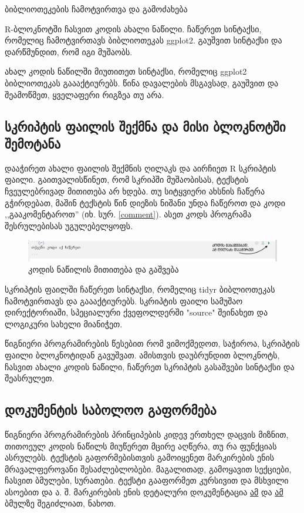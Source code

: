 \documentclass{article}\usepackage[]{graphicx}\usepackage[]{color}
\begin{document}
ბიბლიოთეკების ჩამოტვირთვა და გამოძახება

R-ბლოკნოტში ჩასვით კოდის ახალი ნაწილი. ჩაწერეთ სინტაქსი, რომელიც ჩამოტვირთავს ბიბლიოთეკას ggplot2. გაუშვით სინტაქსი და დარწმუნდით, რომ იგი მუშაობს.

ახალ კოდის ნაწილში მიუთითეთ სინტაქსი, რომელიც ggplot2 ბიბლიოთეკას გაააქტიურებს. წინა დავალების მსგავსად, გაუშვით და შეამოწმეთ, ყველაფერი რიგზეა თუ არა.

\subsection*{ სკრიპტის ფაილის შექმნა და მისი ბლოკნოტში შემოტანა}

დააჭირეთ ახალი ფაილის შექმნის ღილაკს და აირჩიეთ R სკრიპტის ფაილი. გაითვალისწინეთ, რომ სკრიპში მუშაობისას, ტექსტის ჩვეულებრივად მითითება არ ხდება. თუ სიტყვიერი ახსნის ჩაწერა გჭირდებათ, მაშინ ტექსტის წინ დიეზის ნიშანი უნდა ჩაწეროთ და კოდი ,,გააკომენტაროთ'' (იხ. სურ. \ref{comment}). ასეთ კოდს პროგრამა შესრულებისას უგულებელყოფს.

\begin{figure}[h]
\centering
\includegraphics[width=\textwidth]{img/run_chunk.PNG}
\caption{კოდის ნაწილის მითითება და გაშვება}
    \label{chunk}
\end{figure}


სკრიპტის ფაილში ჩაწერეთ სინტაქსი, რომელიც tidyr ბიბლიოთეკას ჩამოტვირთავს და გაააქტიურებს. სკრიპტის ფაილი სამუშაო დირექტორიაში, სპეციალური ქვეფოლდერში "source" შეინახეთ და ლოგიკური სახელი მიანიჭეთ.

წიგნიერი პროგრამირების წესებით რომ ვიმოქმედოთ, საჭიროა, სკრიპტის ფაილი ბლოკნოტიდან გავუშვათ. ამისთვის დაუბრუნდით ბლოკნოტს, ჩასვით ახალი კოდის ნაწილი, ჩაწერეთ სკრიპტის გასაშვები სინტაქსი და შეასრულეთ.

\subsection*{დოკუმენტის საბოლოო გაფორმება}

წიგნიერი პროგრამირების პრინციპების კიდევ ერთხელ დაცვის მიზნით, თითოეულ კოდის ნაწილს მიუწერეთ მცირე აღწერა, თუ რა ფუნქციას ასრულებს. ტექსტის გაფორმებისთვის გამოიყენეთ მარკირების ენის მრავალფეროვანი შესაძლებლობები. მაგალითად, გამოყავით სექციები, ჩასვით ბმულები, სურათები. ტექსტი გააფორმეთ კურსივით და მსხვილი ასოებით და ა. შ. მარკირების ენის დეტალური დოკუმენტაცია \href{https://www.rstudio.com/wp-content/uploads/2016/03/rmarkdown-cheatsheet-2.0.pdf}{ამ} და  \href{https://github.com/adam-p/markdown-here/wiki/Markdown-Cheatsheet}{ამ} ბმულზე შეგიძლიათ, ნახოთ.
\end{document}
